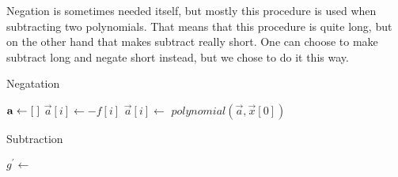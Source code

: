 Negation is sometimes needed itself, but mostly this procedure is used when subtracting two polynomials. That means that this procedure is quite long, but on the other hand that makes subtract really short. One can choose to make subtract long and negate short instead, but we chose to do it this way.
\begin{algorithm}[H]
  \caption{Negatation}
  \begin{algorithmic}[1]
      \State $\mathbf{a}\gets [\hspace*{1mm}]$
          \State $\vec{a}[i]\gets -f[i]$
        \Else
          \State $\vec{a}[i]\gets$ 
        \EndIf
      \EndFor
      \State \Return $polynomial(\vec{a},\vec{x}[0])$
    \EndProcedure
  \end{algorithmic}
\end{algorithm}

\begin{algorithm}[H]
  \caption{Subtraction}
  \begin{algorithmic}[1]
      \State $g^\prime\gets$ 
      \State \Return {}
    \EndProcedure
  \end{algorithmic}
\end{algorithm}


